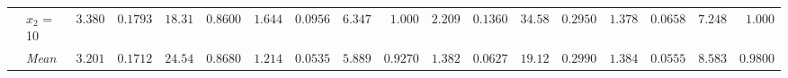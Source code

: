 \begin{table}[htbp]
\begin{tabular}{llrrrrrrrrrrrrrrrr}
 & $x_2$ = 10 & $3.380$ & $0.1793$ & $18.31$ & {\boldmath$0.8600$} & $1.644$ & $0.0956$ & {\boldmath$6.347$} & $1.000$ & $2.209$ & $0.1360$ & $34.58$ & $0.2950$ & {\boldmath$1.378$} & {\boldmath$0.0658$} & $7.248$ & $1.000$ \\
 & \textit{Mean} & $3.201$ & $0.1712$ & $24.54$ & $0.8680$ & \colorbox{green!20}{\boldmath$1.214$} & \colorbox{green!20}{\boldmath$0.0535$} & \colorbox{green!20}{\boldmath$5.889$} & \colorbox{green!20}{\boldmath$0.9270$} & $1.382$ & $0.0627$ & $19.12$ & $0.2990$ & $1.384$ & $0.0555$ & $8.583$ & $0.9800$ \\
\bottomrule
\end{tabular}
\end{table}
